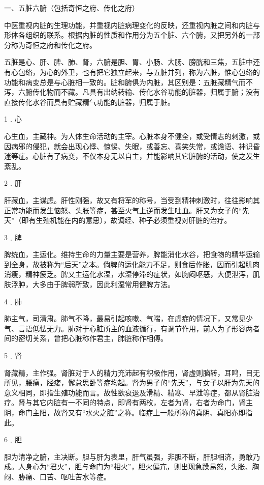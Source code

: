 \documentclass[a4paper,12pt,UTF8,twoside]{ctexbook}
\begin{document}
一、五脏六腑（包括奇恒之府、传化之府）

中医重视内脏的生理功能，并重视内脏病理变化的反映，还重视内脏之间和内脏与形体各组织的联系。根据内脏的性质和作用分为五个脏、六个腑，又把另外的一部分称为奇恒之府和传化之府。

五脏是心、肝、脾、肺、肾，六腑是胆、胃、小肠、大肠、膀胱和三焦，五脏中还有心包络，为心的外卫，也有把它独立起来，与五脏并列，称为六脏，惟心包络的功能和病变总是与心脏相一致的。脏和腑俱为内脏，其区别是：五脏藏精气而不泻，六腑传化物而不藏。凡具有出纳转输、传化水谷功能的脏器，归属于腑；没有直接传化水谷而具有贮藏精气功能的脏器，归属于脏。

1﹒心

心生血，主藏神。为人体生命活动的主宰。心脏本身不健全，或受情志的刺激，或因病邪的侵犯，就会出现心悸、惊惕、失眠，或善忘、喜笑失常，或谵语、神识昏迷等症。心脏有了病变，不仅本身无以自主，并能影响其它脏腑的活动，使之发生紊乱。

2﹒肝

肝藏血，主谋虑。肝性刚强，故又有将军的称号，当受到精神刺激时，往往影响其正常功能而发生恼怒、头胀等症，甚至火气上逆而发生吐血。肝又为女子的“先天”（即有生殖机能在内的意思），故调经、种子必须重视对肝脏的治疗。

3﹒脾

脾统血，主运化。维持生命的力量主要是营养，脾能消化水谷，把食物的精华运输到全身，故被称为“后天”之本。倘脾的运化能力不足，则食后作胀，因而引起肌肉消瘦，精神疲乏。脾又主运化水湿，水湿停滞的症状，如胸闷呕恶，大便泄泻，肌肤浮肿，大多由于脾弱所致，因此利湿常用健脾方法。

4﹒肺

肺主气，司清肃。肺气不降，最易引起咳嗽、气喘，在虚症的情况下，又常见少气、言语低怯无力。肺对于心脏所主的血液循行，有调节作用，前人为了形容两者间的密切关系，曾把心脏称作君主，肺脏称作相傅。

5﹒肾

肾藏精，主作强。肾脏对于人的精力充沛起有积极作用，肾虚则脑转，耳鸣，目无所见，腰痛，胫痠，懈怠思卧等症均起。肾为男子的“先天”，与女子以肝为先天的意义相同，即指生殖功能而言。故性欲衰退及滑精、精寒、早泄等症，都从肾脏治疗。肾与其它内脏有一不同的特点，即肾有两枚，左者为肾，右者为命门，肾主阴，命门主阳，故肾又有“水火之脏”之称。临症上一般所称的真阴、真阳亦即指此。

6﹒胆

胆为清净之腑，主决断。胆与肝为表里，肝气虽强，非胆不断，肝胆相济，勇敢乃成。人身心为“君火”，胆与命门为“相火”，胆火偏亢，则出现急躁易怒，头胀、胸闷、胁痛、口苦、呕吐苦水等症。
\end{document}
